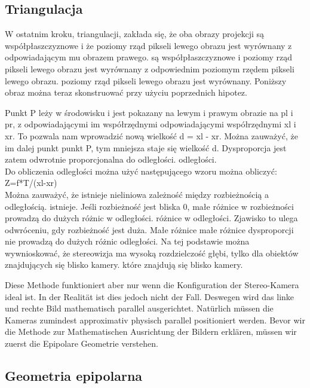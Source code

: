 \documentclass[magisterska]{pracadypl}
\begin{document}
\subsection{Triangulacja}

W ostatnim kroku, triangulacji, zakłada się, że oba obrazy projekcji są współpłaszczyznowe i że poziomy rząd pikseli lewego obrazu jest wyrównany z odpowiadającym mu obrazem prawego.
są współpłaszczyznowe i poziomy rząd pikseli lewego obrazu jest wyrównany z odpowiednim poziomym rzędem pikseli lewego obrazu.
poziomy rząd pikseli lewego obrazu jest wyrównany.
Poniższy obraz można teraz skonstruować przy użyciu poprzednich hipotez.

Punkt P leży w środowisku i jest pokazany na
lewym i prawym obrazie na pl i pr, z odpowiadającymi im współrzędnymi
odpowiadającymi współrzędnymi xl i xr. To
pozwala nam wprowadzić nową wielkość
d = xl - xr. Można zauważyć, że im dalej punkt
punkt P, tym mniejsza staje się wielkość d. Dysproporcja
jest zatem odwrotnie proporcjonalna do odległości.
odległości.\\
Do obliczenia odległości można użyć następującego wzoru
można obliczyć: Z=f*T/(xl-xr)\\

Można zauważyć, że istnieje nieliniowa zależność między rozbieżnością a odległością.
istnieje. Jeśli rozbieżność jest bliska 0, małe różnice w rozbieżności prowadzą do dużych różnic w odległości.
różnice w odległości. Zjawisko to ulega odwróceniu, gdy rozbieżność jest duża. Małe różnice
małe różnice dysproporcji nie prowadzą do dużych różnic odległości. Na tej podstawie
można wywnioskować, że stereowizja ma wysoką rozdzielczość głębi, tylko dla obiektów znajdujących się blisko kamery.
które znajdują się blisko kamery.

Diese Methode funktioniert aber nur wenn die Konfiguration der Stereo-Kamera ideal ist. In
der Realität ist dies jedoch nicht der Fall. Deswegen wird das linke und rechte Bild
mathematisch parallel ausgerichtet. Natürlich müssen die Kameras zumindest approximativ
physisch parallel positioniert werden.
Bevor wir die Methode zur Mathematischen Ausrichtung der Bildern erklären, müssen wir
zuerst die Epipolare Geometrie verstehen.

\subsection{Geometria epipolarna}
\end{document}
